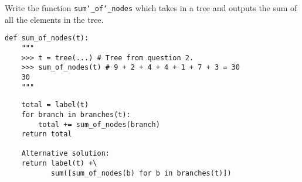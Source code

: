 \begin{blocksection}
\question Write the function \texttt{sum\char`_of\char`_nodes} which takes in a
tree and outputs the sum of all the elements in the tree.
\end{blocksection}

\begin{lstlisting}
def sum_of_nodes(t):
    """
    >>> t = tree(...) # Tree from question 2.
    >>> sum_of_nodes(t) # 9 + 2 + 4 + 4 + 1 + 7 + 3 = 30
    30
    """
\end{lstlisting}
\begin{solution}
\begin{lstlisting}
    total = label(t)
    for branch in branches(t):
        total += sum_of_nodes(branch)
    return total

    Alternative solution:
    return label(t) +\
           sum([sum_of_nodes(b) for b in branches(t)])
\end{lstlisting}
\end{solution}